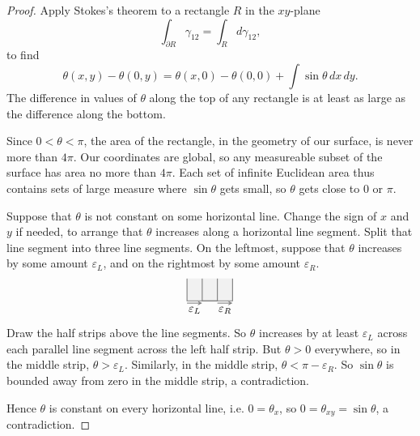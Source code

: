 \begin{proof}
Apply Stokes's theorem to a rectangle \(R\) in the \(xy\)-plane
\[
\int_{\partial R}\gamma_{12}=\int_R d\gamma_{12},
\]
to find
\[
\theta(x,y)-\theta(0,y)=\theta(x,0)-\theta(0,0)+\int \sin \theta \, dx \, dy.
\]
The difference in values of \(\theta\) along the top of any rectangle is at least as large as the difference along the bottom.

Since \(0<\theta<\pi\), the area of the rectangle, in the geometry of our surface, is never more than \(4\pi\).
Our coordinates are global, so any measureable subset of the surface has area no more than \(4\pi\).
Each set of infinite Euclidean area thus contains sets of large measure where \(\sin \theta\) gets small, so \(\theta\) gets close to \(0\) or \(\pi\).

Suppose that \(\theta\) is not constant on some horizontal line.
Change the sign of \(x\) and \(y\) if needed, to arrange that \(\theta\) increases along a horizontal line segment.
Split that line segment into three line segments.
On the leftmost, suppose that \(\theta\) increases by some amount \(\varepsilon_L\), and on the rightmost by some amount \(\varepsilon_R\).
\[
\begin{tikzpicture}[scale=.7]
\fill[gray!40,opacity=.25](-1,0) rectangle (1,1);
\draw[thick,gray] (-1,1) -- (-1,0) -- (1,0) -- (1,1);
\draw[thick,gray] (-.333,1) -- (-.333,0) -- (.333,0) -- (.333,1);
\node (b) at (-.333,-.1){};
\node (c) at (.333,-.1){};
\draw[-stealth,thick,gray] (-1,-.1) -- (-.333,-.1);
\node[below] at (-.666,-.1) {\(\varepsilon_L\)};
\draw[-stealth,thick,gray] (.333,-.1) -- (1,-.1);
\node[below] at (.666,-.1) {\(\varepsilon_R\)};
\end{tikzpicture}
\]
Draw the half strips above the line segments.
So \(\theta\) increases by at least \(\varepsilon_L\) across each parallel line segment across the left half strip.
But \(\theta>0\) everywhere, so in the middle strip, \(\theta>\varepsilon_L\).
Similarly, in the middle strip, \(\theta<\pi-\varepsilon_R\).
So \(\sin \theta\) is bounded away from zero in the middle strip, a contradiction.

Hence \(\theta\) is constant on every horizontal line, i.e. \(0=\theta_x\), so \(0=\theta_{xy}=\sin \theta\), a contradiction.
\end{proof}

